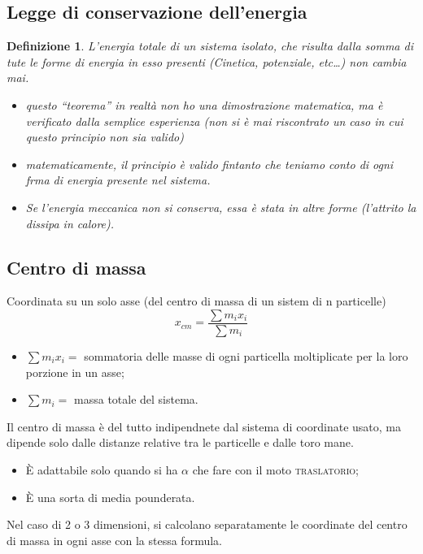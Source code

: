 \documentclass{book}
\newtheorem{defi}{Definizione}[section]
\begin{document}
\subsection{Legge di conservazione dell'energia}
\label{sec:leggconsen}
\begin{defi}
  L'energia totale di un sistema isolato, che risulta dalla somma di tute le forme di energia in esso presenti (Cinetica, potenziale, etc\dots) non cambia mai.
  \begin{itemize}
  \item questo ``teorema'' in realtà non ho una dimostrazione matematica, ma è verificato dalla semplice esperienza (non si è mai riscontrato un caso in cui questo principio non sia valido)
  \item matematicamente, il principio è valido fintanto che teniamo conto di ogni frma di energia presente nel sistema.
  \item Se l'energia meccanica non si conserva, essa è stata in altre forme (l'attrito la dissipa in calore).
  \end{itemize}
\end{defi}

\subsection{Centro di massa}
\label{sec:centdimassa}

Coordinata su un solo asse (del centro di massa di un sistem di n particelle)
\begin{equation}
  \label{eq:centdimassa}
  x_{cm}=\frac{\sum m_ix_i}{\sum m_i}
\end{equation}
\begin{itemize}
\item $\sum m_ix_i=$ sommatoria delle masse di ogni particella moltiplicate per la loro porzione in un asse;
\item $\sum m_i=$ massa totale del sistema.
\end{itemize}
Il centro di massa è del tutto indipendnete dal sistema di coordinate usato, ma dipende solo dalle distanze relative tra le particelle e dalle toro mane.
\begin{itemize}
\item È adattabile solo quando si ha $\alpha$ che fare con il moto \textsc{traslatorio};
\item È una sorta di media pounderata.
\end{itemize}
Nel caso di 2 o 3 dimensioni, si calcolano separatamente le coordinate del centro di massa in ogni asse con la stessa formula.
\end{document}
